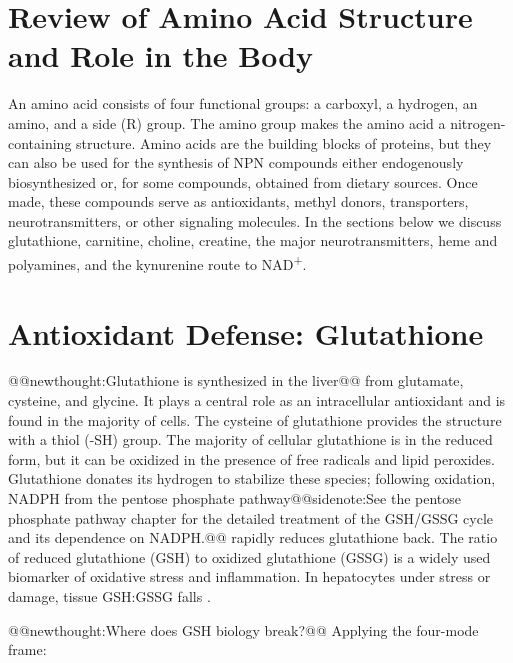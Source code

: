\documentclass{tufte-handout}
\makeatletter
\def\newthought#1{@@newthought:#1@@}
\def\sidenote#1{@@sidenote:#1@@}
\makeatother
\begin{document}
\section{Review of Amino Acid Structure and Role in the Body}
An amino acid consists of four functional groups: a carboxyl, a hydrogen, an amino, and a side (R) group. The amino group makes the amino acid a nitrogen-containing structure. Amino acids are the building blocks of proteins, but they can also be used for the synthesis of NPN compounds either endogenously biosynthesized or, for some compounds, obtained from dietary sources. Once made, these compounds serve as antioxidants, methyl donors, transporters, neurotransmitters, or other signaling molecules. In the sections below we discuss glutathione, carnitine, choline, creatine, the major neurotransmitters, heme and polyamines, and the kynurenine route to NAD\textsuperscript{+}.

\section{Antioxidant Defense: Glutathione}
\newthought{Glutathione is synthesized in the liver} from glutamate, cysteine, and glycine. It plays a central role as an intracellular antioxidant and is found in the majority of cells. The cysteine of glutathione provides the structure with a thiol (-SH) group. The majority of cellular glutathione is in the reduced form, but it can be oxidized in the presence of free radicals and lipid peroxides. Glutathione donates its hydrogen to stabilize these species; following oxidation, NADPH from the pentose phosphate pathway\sidenote{See the pentose phosphate pathway chapter for the detailed treatment of the GSH/GSSG cycle and its dependence on NADPH.} rapidly reduces glutathione back. The ratio of reduced glutathione (GSH) to oxidized glutathione (GSSG) is a widely used biomarker of oxidative stress and inflammation. In hepatocytes under stress or damage, tissue GSH:GSSG falls \citep{zitkaRedoxStatusExpressed2012,sentellasGSSGGSHRatios2014}.

\newthought{Where does GSH biology break?} Applying the four-mode frame:
\end{document}
